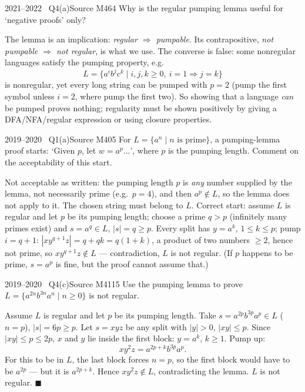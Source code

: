\documentclass[11pt,a4paper]{article}
\begin{document}
\begin{question}{2021--2022 \textbullet\ Q4(a)}{Source M46}{4}
Why is the regular pumping lemma useful for `negative proofs' only?
\end{question}
\begin{solution}
The lemma is an implication: \emph{regular $\Rightarrow$ pumpable}. Its contrapositive, \emph{not pumpable $\Rightarrow$ not regular}, is what we use. The converse is false: some nonregular languages satisfy the pumping property, e.g.
\[ L=\{a^ib^jc^k\mid i,j,k\ge0,\ i=1\Rightarrow j=k\} \]
is nonregular, yet every long string can be pumped with $p=2$ (pump the first symbol unless $i=2$, where pump the first two). So showing that a language \emph{can} be pumped proves nothing; regularity must be shown positively by giving a DFA/NFA/regular expression or using closure properties.
\end{solution}

\begin{question}{2019--2020 \textbullet\ Q1(a)}{Source M40}{5}
For $L=\{a^n\mid n \text{ is prime}\}$, a pumping-lemma proof starts: `Given $p$, let $w=a^p\ldots$', where $p$ is the pumping length. Comment on the acceptability of this start.
\end{question}
\begin{solution}
Not acceptable as written: the pumping length $p$ is \emph{any} number supplied by the lemma, not necessarily prime (e.g.\ $p=4$), and then $a^p\notin L$, so the lemma does not apply to it. The chosen string must belong to $L$. Correct start: assume $L$ is regular and let $p$ be its pumping length; choose a prime $q>p$ (infinitely many primes exist) and $s=a^q\in L$, $|s|=q\ge p$. Every split has $y=a^k$, $1\le k\le p$; pump $i=q+1$: $|xy^{q+1}z|=q+qk=q(1+k)$, a product of two numbers $\ge2$, hence not prime, so $xy^{q+1}z\notin L$ --- contradiction, $L$ is not regular. (If $p$ happens to be prime, $s=a^p$ is fine, but the proof cannot assume that.)
\end{solution}

\begin{question}{2019--2020 \textbullet\ Q4(c)}{Source M41}{15}
Use the pumping lemma to prove $L=\{a^{2n}b^{3n}a^n\mid n\ge0\}$ is not regular.
\end{question}
\begin{solution}
Assume $L$ is regular and let $p$ be its pumping length. Take $s=a^{2p}b^{3p}a^p\in L$ ($n=p$), $|s|=6p\ge p$. Let $s=xyz$ be any split with $|y|>0$, $|xy|\le p$. Since $|xy|\le p\le 2p$, $x$ and $y$ lie inside the first block: $y=a^k$, $k\ge1$. Pump up:
\[ xy^2z=a^{2p+k}b^{3p}a^p. \]
For this to be in $L$, the last block forces $n=p$, so the first block would have to be $a^{2p}$ --- but it is $a^{2p+k}$. Hence $xy^2z\notin L$, contradicting the lemma. $L$ is not regular. \hfill$\blacksquare$
\end{solution}
\end{document}
